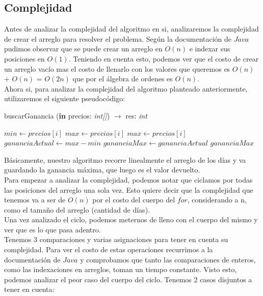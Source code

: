\clearpage


\subsection{Complejidad}
\indent Antes de analizar la complejidad del algoritmo en si, analizaremos la complejidad de crear el arreglo para resolver el problema. Según la documentación de $Java$ pudimos observar que se puede crear un arreglo en $O(n)$ e indexar sus posiciones en $O(1)$. Teniendo en cuenta esto, podemos ver que el costo de crear un arreglo vacío mas el costo de llenarlo con los valores que queremos es $O(n)$ + $O(n)$ = $O(2n)$ que por el álgebra de ordenes es $O(n)$.\\
\indent Ahora si, para analizar la complejidad del algoritmo planteado anteriormente, utilizaremos el siguiente pseudocódigo:

\begin{algorithm}
\caption{buscarGanancia (\textbf{in} precios: \textsl{int[]}) $\rightarrow$ res: \textsl{int}}
\begin{algorithmic}[1]

		\STATE $min \leftarrow precios[i]$
		\STATE $max \leftarrow precios[i]$
	\ENDIF
		\STATE $max \leftarrow precios[i]$
	\ENDIF	
	\STATE $gananciaActual \leftarrow max - min$
		\STATE $gananciaMax \leftarrow gananciaActual$
	\ENDIF
\ENDFOR
\RETURN $gananciaMax$
\end{algorithmic}
\end{algorithm}

\indent Básicamente, nuestro algoritmo recorre linealmente el arreglo de los días y va guardando la ganancia máxima, que luego es el valor devuelto.\\
\indent Para empezar a analizar la complejidad, podemos notar que ciclamos por todas las posiciones del arreglo una sola vez. Esto quiere decir que la complejidad que tenemos va a ser de $O(n)$ por el costo del cuerpo del $for$, considerando a n, como el tamaño del arreglo (cantidad de días).\\
\indent Una vez analizado el ciclo, podemos meternos de lleno con el cuerpo del mismo y ver que es lo que pasa adentro.\\
\indent Tenemos 3 comparaciones y varias asignaciones para tener en cuenta su complejidad. Para ver el costo de estas operaciones recurrimos a la documentación de $Java$ y comprobamos que tanto las comparaciones de enteros, como las indexaciones en arreglos, toman un tiempo constante. Visto esto, podemos analizar el peor caso del cuerpo del ciclo. Tenemos 2 casos disjuntos a tener en cuenta:


